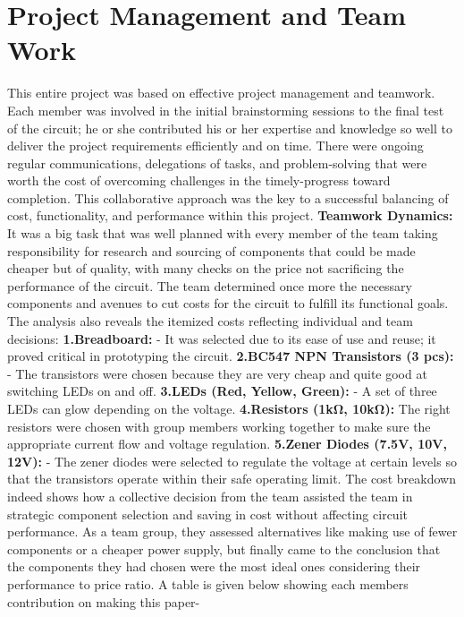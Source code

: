 
\section{Project Management and Team Work}


This entire project was based on effective project management and teamwork. Each member was involved in the initial brainstorming sessions to the final test of the circuit; he or she contributed his or her expertise and knowledge so well to deliver the project requirements efficiently and on time. There were ongoing regular communications, delegations of tasks, and problem-solving that were worth the cost of overcoming challenges in the timely-progress toward completion. This collaborative approach was the key to a successful balancing of cost, functionality, and performance within this project.
\vspace{.5 cm}
\newline\textbf{Teamwork Dynamics:}
It was a big task that was well planned with every member of the team taking responsibility for research and sourcing of components that could be made cheaper but of quality, with many checks on the price not sacrificing the performance of the circuit. The team determined once more the necessary components and avenues to cut costs for the circuit to fulfill its functional goals. The analysis also reveals the itemized costs reflecting individual and team decisions:
\newline\textbf{1.Breadboard:} - It was selected due to its ease of use and reuse; it proved critical in prototyping the circuit.
\newline\textbf{2.BC547 NPN Transistors (3 pcs):} - The transistors were chosen because they are very cheap and quite good at switching LEDs on and off.
\newline\textbf{3.LEDs (Red, Yellow, Green):} - A set of three LEDs can glow depending on the voltage.
\newline\textbf{4.Resistors (1kΩ, 10kΩ):} The right resistors were chosen with group members working together to make sure the appropriate current flow and voltage regulation.
\newline\textbf{5.Zener Diodes (7.5V, 10V, 12V):} - The zener diodes were selected to regulate the voltage at certain levels so that the transistors operate within their safe operating limit.
\vspace{.5 cm}
\newline The cost breakdown indeed shows how a collective decision from the team assisted the team in strategic component selection and saving in cost without affecting circuit performance. As a team group, they assessed alternatives like making use of fewer components or a cheaper power supply, but finally came to the conclusion that the components they had chosen were the most ideal ones considering their performance to price ratio.\cite{b19} A table is given below showing each members contribution on making this paper-

